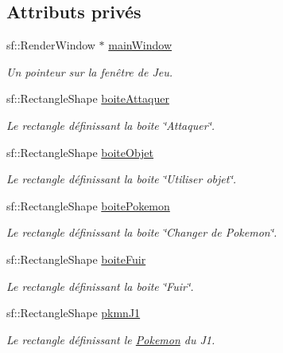\subsection*{Attributs privés}
\begin{DoxyCompactItemize}
\item 
sf\+::\+Render\+Window $\ast$ \hyperlink{class_s_f_m_l_combat_a78da4b3f5a924922d26db0b756531505}{main\+Window}
\begin{DoxyCompactList}\small\item\em Un pointeur sur la fenêtre de Jeu. \end{DoxyCompactList}\item 
sf\+::\+Rectangle\+Shape \hyperlink{class_s_f_m_l_combat_a3dbd6e3e3626b934d91feeecfdc75f2f}{boite\+Attaquer}
\begin{DoxyCompactList}\small\item\em Le rectangle définissant la boite \char`\"{}\+Attaquer\char`\"{}. \end{DoxyCompactList}\item 
sf\+::\+Rectangle\+Shape \hyperlink{class_s_f_m_l_combat_a7a7d3634ff67cf57c61d343e07800586}{boite\+Objet}
\begin{DoxyCompactList}\small\item\em Le rectangle définissant la boite \char`\"{}\+Utiliser objet\char`\"{}. \end{DoxyCompactList}\item 
sf\+::\+Rectangle\+Shape \hyperlink{class_s_f_m_l_combat_a752cb4de138e2aa37f12c237efea253e}{boite\+Pokemon}
\begin{DoxyCompactList}\small\item\em Le rectangle définissant la boite \char`\"{}\+Changer de Pokemon\char`\"{}. \end{DoxyCompactList}\item 
sf\+::\+Rectangle\+Shape \hyperlink{class_s_f_m_l_combat_a0a9270612142eaa1406152265ba839b2}{boite\+Fuir}
\begin{DoxyCompactList}\small\item\em Le rectangle définissant la boite \char`\"{}\+Fuir\char`\"{}. \end{DoxyCompactList}\item 
sf\+::\+Rectangle\+Shape \hyperlink{class_s_f_m_l_combat_aced33a85a7133efb947d8c472f770ec1}{pkmn\+J1}
\begin{DoxyCompactList}\small\item\em Le rectangle définissant le \hyperlink{class_pokemon}{Pokemon} du J1. \end{DoxyCompactList}\item 

\end{DoxyCompactItemize}
